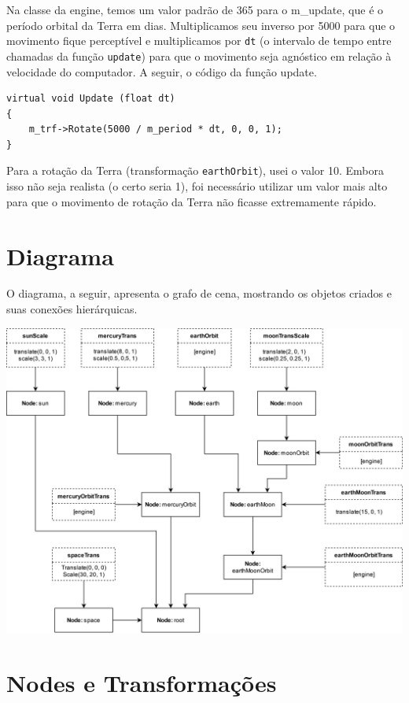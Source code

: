 \documentclass[11pt, a4paper]{article}
\begin{document}
Na classe da engine, temos um valor padrão de 365 para o m\_update, que é o período 
orbital da Terra em dias. Multiplicamos seu inverso por 5000 para que o movimento fique 
perceptível e multiplicamos por \texttt{dt} (o intervalo de tempo entre 
chamadas da função \texttt{update}) para que o movimento seja agnóstico em 
relação à velocidade do computador. A seguir, o código da função update.

\begin{verbatim}
virtual void Update (float dt)
{
    m_trf->Rotate(5000 / m_period * dt, 0, 0, 1);
}
\end{verbatim}

Para a rotação da Terra (transformação \texttt{earthOrbit}), usei o valor 10. 
Embora isso não seja realista (o certo seria 1), foi necessário utilizar um 
valor mais alto para que o movimento de rotação da Terra não ficasse extremamente 
rápido.

\section {Diagrama}

O diagrama, a seguir, apresenta o grafo de cena, mostrando os objetos criados e 
suas conexões hierárquicas.

\includegraphics[width=\linewidth]{Trab1Graph.png}

\section {Nodes e Transformações}
\end{document}
